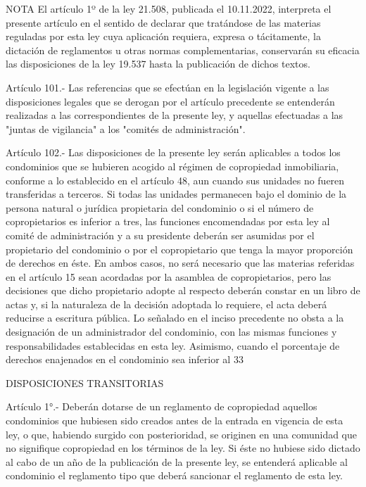 NOTA
      El artículo 1º de la ley 21.508, publicada el 10.11.2022, interpreta el presente artículo en el sentido de declarar que tratándose de las materias reguladas por esta ley cuya aplicación requiera, expresa o tácitamente, la dictación de reglamentos u otras normas complementarias, conservarán su eficacia las disposiciones de la ley 19.537 hasta la publicación de dichos textos.
   
    Artículo 101.- Las referencias que se efectúan en la legislación vigente a las disposiciones legales que se derogan por el artículo precedente se entenderán realizadas a las correspondientes de la presente ley, y aquellas efectuadas a las "juntas de vigilancia" a los "comités de administración".
     
    Artículo 102.- Las disposiciones de la presente ley serán aplicables a todos los condominios que se hubieren acogido al régimen de copropiedad inmobiliaria, conforme a lo establecido en el artículo 48, aun cuando sus unidades no fueren transferidas a terceros.
    Si todas las unidades permanecen bajo el dominio de la persona natural o jurídica propietaria del condominio o si el número de copropietarios es inferior a tres, las funciones encomendadas por esta ley al comité de administración y a su presidente deberán ser asumidas por el propietario del condominio o por el copropietario que tenga la mayor proporción de derechos en éste. En ambos casos, no será necesario que las materias referidas en el artículo 15 sean acordadas por la asamblea de copropietarios, pero las decisiones que dicho propietario adopte al respecto deberán constar en un libro de actas y, si la naturaleza de la decisión adoptada lo requiere, el acta deberá reducirse a escritura pública.
    Lo señalado en el inciso precedente no obsta a la designación de un administrador del condominio, con las mismas funciones y responsabilidades establecidas en esta ley.
    Asimismo, cuando el porcentaje de derechos enajenados en el condominio sea inferior al 33%
 
 
    DISPOSICIONES TRANSITORIAS


     
    Artículo 1°.- Deberán dotarse de un reglamento de copropiedad aquellos condominios que hubiesen sido creados antes de la entrada en vigencia de esta ley, o que, habiendo surgido con posterioridad, se originen en una comunidad que no signifique copropiedad en los términos de la ley. Si éste no hubiese sido dictado al cabo de un año de la publicación de la presente ley, se entenderá aplicable al condominio el reglamento tipo que deberá sancionar el reglamento de esta ley.
     

